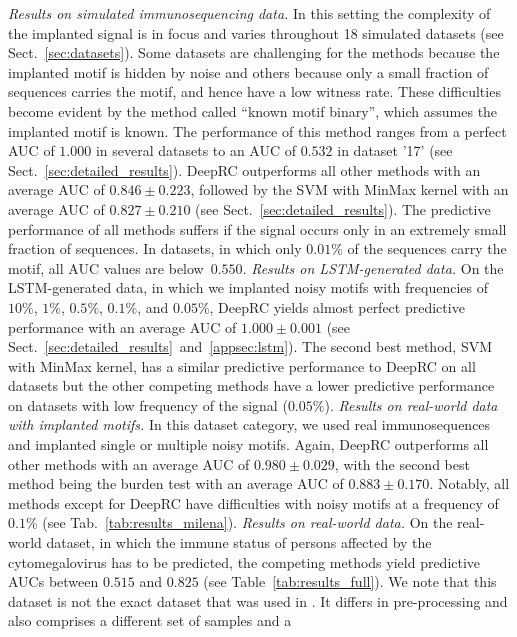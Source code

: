 \documentclass[oneside]{book}
\begin{document}
%
\emph{Results on simulated immunosequencing data.}
In this setting the complexity of the implanted signal is in focus and varies 
throughout 18 simulated datasets (see Sect.~\ref{sec:datasets}).
Some datasets are challenging for the methods because
the implanted motif is hidden by noise and others because
only a small fraction of sequences carries the motif, 
and hence have a low witness rate.
These difficulties
become evident by the method called ``known motif binary'', which assumes
the implanted motif is known.
The performance of this method ranges from a
perfect AUC of $1.000$ in several datasets to an 
AUC of $0.532$ in dataset '17' (see Sect.~\ref{sec:detailed_results}).
DeepRC outperforms all other methods with an average AUC of $0.846\pm0.223$, 
followed by the SVM with MinMax kernel with an average AUC of $0.827\pm0.210$ (see Sect.~\ref{sec:detailed_results}).
The predictive
performance of all methods suffers if the signal occurs only in an extremely
small fraction of sequences. %
In datasets, in which only $0.01\%$ of the sequences
carry the motif, all AUC values are below~$0.550$.
%
\emph{Results on LSTM-generated data.}
On the LSTM-generated data, in which we implanted noisy motifs 
with frequencies of $10\%$, $1\%$, $0.5\%$, $0.1\%$, and $0.05\%$, DeepRC yields almost
perfect predictive performance with an average AUC of $1.000\pm0.001$  
(see Sect.~\ref{sec:detailed_results}~and~\ref{appsec:lstm}). The second best method, 
SVM with MinMax kernel, has a similar predictive performance 
to DeepRC on all datasets but the other 
competing methods have a lower predictive performance 
on datasets with low frequency of the signal ($0.05\%$).
%
\emph{Results on real-world data with implanted motifs.}
In this dataset category, we used real immunosequences and
implanted single or multiple noisy motifs. Again, 
DeepRC outperforms all other methods with an average AUC of $0.980\pm0.029$,
with the second best method being the burden test with 
an average AUC of $0.883\pm0.170$.
Notably, all methods except for DeepRC have difficulties with noisy
motifs at a frequency of $0.1\%$ 
(see Tab.~\ref{tab:results_milena}). 
%
\emph{Results on real-world data.}
On the real-world dataset, in which the immune status of persons affected
by the cytomegalovirus has to be predicted, the competing methods yield 
predictive AUCs between $0.515$ and $0.825$ (see Table~\ref{tab:results_full}). We note that this dataset is 
not the exact dataset that was used in  
\citet{emerson2017immunosequencing}.
It differs in pre-processing and also comprises a 
different set of samples and a 
\end{document}
